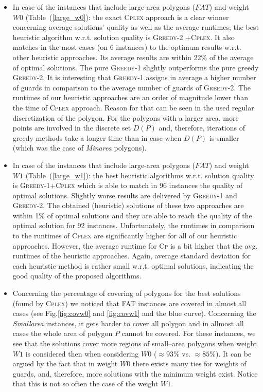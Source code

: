 \documentclass[runningheads,a4paper]{elsarticle}
\begin{document}
\begin{itemize}
     	\item In case of the instances that include large-area polygons ($FAT$) and weight $W0$ (Table~(\ref{large_w0}): the exact \textsc{Cplex} approach is a clear winner concerning average solutions' quality as well as the average runtimes;  the best heuristic algorithm w.r.t. solution quality is \textsc{Greedy-2 +Cplex}. It also matches in the most cases (on 6 instances) to the optimum results w.r.t. other heuristic approaches. Its average results are within 22\% of the average of  optimal solutions.  The pure \textsc{Greedy-1} slightly outperforms the pure greedy \textsc{Greedy-2}. It is interesting that \textsc{Greedy-1} assigns in average a  higher number of guards in comparison to the average number of guards of \textsc{Greedy-2}. The runtimes of our heuristic approaches are an order of magnitude lower than the time of \textsc{Cplex} approach. Reason for that can be seen in the used regular discretization of the polygon. For the polygons with a larger area, more points are involved in the discrete set $D(P)$ and, therefore, iterations of greedy methods take a longer time than in case when $D(P)$ is smaller (which was the case of \emph{Minarea} polygons).
     	\item  In case of the instances that include large-area polygons ($FAT$) and weight $W1$ (Table~(\ref{large_w1}): the best heuristic algorithms w.r.t. solution quality is \textsc{Greedy-1+Cplex} which is able to match in 96 instances the quality of optimal solutions. Slightly worse results are delivered by \textsc{Greedy-1} and \textsc{Greedy-2}. The obtained (heuristic) solutions of these two approaches are within 1\% of optimal solutions and they are
     	able to reach the quality of the optimal solution for 92 instances. Unfortunately, the runtimes in comparison to the runtimes of \textsc{Cplex} are significantly higher for all of our heuristic approaches. However, the average runtime for \textsc{Cp} is a bit higher that the avg. runtimes of the heuristic approaches. Again, average standard deviation for each heuristic method is rather small w.r.t. optimal solutions, indicating the good quality of the proposed algorithms.
     	\item  Concerning the percentage of covering of polygons for the best solutions (found by \textsc{Cplex}) we
     	noticed that  \textsc{FAT} instances are covered in almost all cases (see Fig.\ref{fig:covw0} and \ref{fig:covw1} and the blue curve). Concerning the \textit{Smallarea} instances, it gets harder to cover all polygon and in allmost all cases the whole area of polygon $P$ cannot be covered. For these instances, we see that the solutions cover more regions of small--area polygons when weight $W1$ is considered then when considering $W0$ ($\approx 93 \%$ vs. $\approx 85\%$). It can be argued by the fact that in weight $W0$ there exists many ties for weights of guards, and, therefore, more solutions with the minimum weight exist.
     	Notice that this is not so often the case of the weight $W1$.
     	
     \end{itemize}
\end{document}
